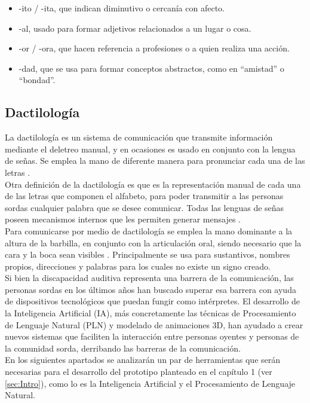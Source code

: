 \begin{itemize}
    \item -ito / -ita, que indican diminutivo o cercanía con afecto.
    \item -al, usado para formar adjetivos relacionados a un lugar o cosa.
    \item -or / -ora, que hacen referencia a profesiones o a quien realiza una acción.
    \item -dad, que se usa para formar conceptos abstractos, como en “amistad” o “bondad”.
\end{itemize}

\subsection{Dactilología}
La dactilología es un sistema de comunicación que transmite información mediante el deletreo manual, y en ocasiones es usado en conjunto con la lengua de señas. Se emplea la mano de diferente manera para pronunciar cada una de las letras \cite{ref30}.\\

Otra definición de la dactilología es que es la representación manual de cada una de las letras que componen el alfabeto, para poder transmitir a las personas sordas cualquier palabra que se desee comunicar. Todas las lenguas de señas poseen mecanismos internos que les permiten generar mensajes \cite{ref40}.\\

Para comunicarse por medio de dactilología se emplea la mano dominante a la altura de la barbilla, en conjunto con la articulación oral, siendo necesario que la cara y la boca sean visibles \cite{ref40}. Principalmente se usa para sustantivos, nombres propios, direcciones y palabras para los cuales no existe un signo creado.\\

Si bien la discapacidad auditiva representa una barrera de la comunicación, las personas sordas en los últimos años han buscado superar esa barrera con ayuda de dispositivos tecnológicos que puedan fungir como intérpretes. El desarrollo de la Inteligencia Artificial (IA), más concretamente las técnicas de Procesamiento de Lenguaje Natural (PLN) y modelado de animaciones 3D, han ayudado a crear nuevos sistemas que faciliten la interacción entre personas oyentes y personas de la comunidad sorda, derribando las barreras de la comunicación.\\

En los siguientes apartados se analizarán un par de herramientas que serán necesarias para el desarrollo del prototipo planteado en el capítulo 1 (ver \autoref{sec:Intro}), como lo es la Inteligencia Artificial y el Procesamiento de Lenguaje Natural.\\

